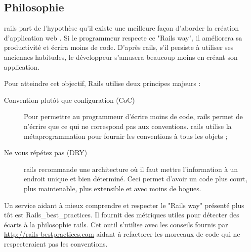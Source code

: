 \subsection{Philosophie}
\gls{rails} part de l'hypothèse qu'il existe une meilleure façon d'aborder la création d'application web \cite{rails-guides}. Si le programmeur respecte ce "Rails way", il améliorera sa productivité et écrira moins de code. D'après \gls{rails}, s’il persiste à utiliser ses anciennes habitudes, le développeur s'amusera beaucoup moins en créant son application.

Pour atteindre cet objectif, Rails utilise deux principes majeurs :
\begin{description}
  \item[Convention plutôt que configuration (CoC) \cite{wiki-coc}] Pour permettre au programmeur d'écrire moins de code, \gls{rails} permet de n'écrire que ce qui ne correspond pas aux conventions. \gls{rails} utilise la métaprogrammation pour fournir les conventions à tous les objets ;
  \item[Ne vous répétez  pas (DRY) \cite{wiki-dry}] \gls{rails} recommande une architecture où il faut mettre l'information à un endroit unique et bien déterminé. Ceci permet d'avoir un code plus court, plus maintenable, plus extensible et avec moins de bogues.
\end{description}

\label{rbp}
Un service aidant à mieux comprendre et respecter le "Rails way" présenté plus tôt est Rails\_best\_practices. Il fournit des métriques utiles pour détecter des écarts à la philosophie \gls{rails}. Cet outil s'utilise avec les conseils fournis par \url{http://rails-bestpractices.com} aidant à refactorer les morceaux de code qui ne respecteraient pas les conventions.

